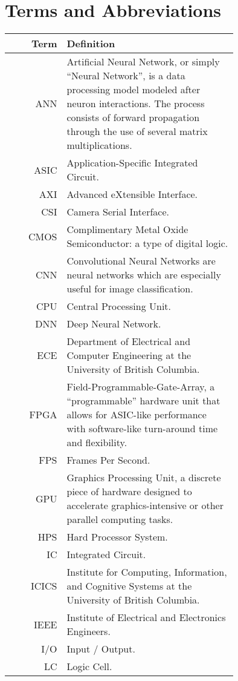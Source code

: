 \section*{Terms and Abbreviations}

\begin{tabular}[h]{rp{0.75\linewidth}}
    \hline
    \textbf{Term} & \textbf{Definition}\\
    \hline

    ANN & Artificial Neural Network, or simply ``Neural Network'', is a data processing model modeled after neuron interactions. The process consists of forward propagation through the use of several matrix multiplications.\cite{ann}\\
    ASIC & Application-Specific Integrated Circuit.\\
    AXI & Advanced eXtensible Interface. \\
    CSI & Camera Serial Interface. \\
    CMOS & Complimentary Metal Oxide Semiconductor: a type of digital logic. \\
    CNN & Convolutional Neural Networks are neural networks which are especially useful for image classification.\cite{cnn} \\
    CPU & Central Processing Unit. \\
    DNN & Deep Neural Network. \\
    ECE & Department of Electrical and Computer Engineering at the University of British Columbia.\\
    FPGA & Field-Programmable-Gate-Array, a ``programmable'' hardware unit that allows for ASIC-like performance with software-like turn-around time and flexibility.\\
    FPS & Frames Per Second.\\
    GPU & Graphics Processing Unit, a discrete piece of hardware designed to accelerate graphics-intensive or other parallel computing tasks.\\
    HPS & Hard Processor System. \\
    IC & Integrated Circuit. \\
	ICICS & Institute for Computing, Information, and Cognitive Systems at the University of British Columbia.\\
    IEEE & Institute of Electrical and Electronics Engineers. \\
    I/O & Input / Output. \\
    LC & Logic Cell. \\

\end{tabular}
